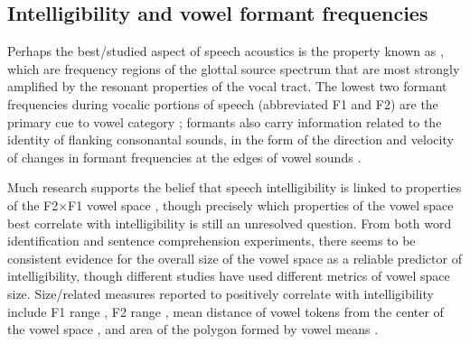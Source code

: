 \subsection{Intelligibility and vowel formant frequencies\label{sec:IntelVowel}}
Perhaps the best\-/studied aspect of speech acoustics is the property known as , which are frequency regions of the glottal source spectrum that are most strongly amplified by the resonant properties of the vocal tract.  The lowest two formant frequencies during vocalic portions of speech (abbreviated F1 and F2) are the primary cue to vowel category \citep{SyrdalGopal1986}; formants also carry information related to the identity of flanking consonantal sounds, in the form of the direction and velocity of changes in formant frequencies at the edges of vowel sounds \citep{DelattreEtAl1955}.

Much research supports the belief that speech intelligibility is linked to properties of the F2×F1 vowel space \citep[\eg,][]{BondMoore1994, BradlowEtAl1996, HazanMarkham2004, Neel2008}, though precisely which properties of the vowel space best correlate with intelligibility is still an unresolved question.  From both word identification and sentence comprehension experiments, there seems to be consistent evidence for the overall size of the vowel space as a reliable predictor of intelligibility, though different studies have used different metrics of vowel space size.  Size\-/related measures reported to positively correlate with intelligibility include F1 range \citep{BradlowEtAl1996}, F2 range \citep{HazanMarkham2004}, mean distance of vowel tokens from the center of the vowel space \citep{BradlowEtAl1996}, and area of the polygon formed by vowel means \citep{Neel2008, McCloyEtAl2012}.\footnotemark{}%

